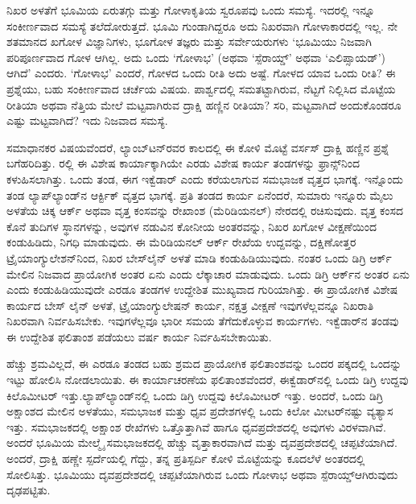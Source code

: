ನಿಖರ ಅಳತೆಗೆ ಭೂಮಿಯ ಏರುತಗ್ಗು ಮತ್ತು ಗೋಳಾಕೃತಿಯ ಸ್ವರೂಪವು ಒಂದು ಸಮಸ್ಯೆ. ಇದರಲ್ಲಿ ಇನ್ನೂ ಸಂಕೀರ್ಣವಾದ ಸಮಸ್ಯೆ ತಲೆದೋರುತ್ತದೆ. ಭೂಮಿ ಗುಂಡಾಗಿದ್ದರೂ ಅದು ನಿಖರವಾಗಿ ಗೋಳಾಕಾರದಲ್ಲಿ ಇಲ್ಲ. ನೇ ಶತಮಾನದ ಖಗೋಳ ವಿಜ್ಞಾನಿಗಳು, ಭೂಗೋಳ ತಜ್ಞರು ಮತ್ತು ಸರ್ವೇಯರುಗಳು ‘ಭೂಮಿಯು ನಿಜವಾಗಿ ಪರಿಪೂರ್ಣವಾದ ಗೋಳ ಆಗಿಲ್ಲ. ಅದು ಒಂದು ‘ಗೋಳಾಭ’ (ಅಥವಾ ‘ಸ್ಪೆರಾಯ್ಡ್​’ ಅಥವಾ ‘ಎಲಿಪ್ಸಾಯಡ್​’) ಆಗಿದೆ’ ಎಂದರು. ‘ಗೋಳಾಭ’ ಎಂದರೆ, ಗೋಳದ ಒಂದು ರೀತಿ ಅದು ಅಷ್ಟೆ. ಗೋಳದ ಯಾವ ಒಂದು ರೀತಿ? ಈ ಪ್ರಶ್ನೆಯು, ಬಹು ಸಂಕೀರ್ಣವಾದ ಚರ್ಚೆಯ ವಿಷಯ. ಪಾರ್ಶ್ವದಲ್ಲಿ ಸಮತಟ್ಟಾಗಿರುವ, ನೆಟ್ಟಗೆ ನಿಲ್ಲಿಸಿದ ಮೊಟ್ಟೆಯ ರೀತಿಯಾ ಅಥವಾ ನೆತ್ತಿಯ ಮೇಲೆ ಮಟ್ಟವಾಗಿರುವ ದ್ರಾಕ್ಷಿ ಹಣ್ಣಿನ ರೀತಿಯಾ? ಸರಿ, ಮಟ್ಟವಾಗಿದೆ ಅಂದುಕೊಂಡರೂ ಎಷ್ಟು ಮಟ್ಟವಾಗಿದೆ? ಇದು ನಿಜವಾದ ಸಮಸ್ಯೆ.

ಸಮಾಧಾನಕರ ವಿಷಯವೆಂದರೆ, ಲ್ಯಾಂಬ್​ಟನ್​ರವರ ಕಾಲದಲ್ಲಿ ಈ ಕೋಳಿ ಮೊಟ್ಟೆ ವರ್ಸಸ್​ ದ್ರಾಕ್ಷಿ ಹಣ್ಣಿನ ಪ್ರಶ್ನೆ ಬಗೆಹರಿದಿತ್ತು. ರಲ್ಲಿ ಈ ವಿಶೇಷ ಕಾರ್ಯಾಕ್ಕಾಗಿಯೇ ಎರಡು ವಿಶೇಷ ಕಾರ್ಯ ತಂಡಗಳನ್ನು ಫ್ರಾನ್ಸ್​ನಿಂದ ಕಳುಹಿಸಲಾಗಿತ್ತು. ಒಂದು ತಂಡ, ಈಗ ಇಕ್ವೆಡಾರ್​ ಎಂದು ಕರೆಯಲಾಗುವ ಸಮಭಾಜಕ ವೃತ್ತದ ಭಾಗಕ್ಕೆ. ಇನ್ನೊಂದು ತಂಡ ಲ್ಯಾಪ್​ಲ್ಯಾಂಡ್​ನ ಆರ್ಕ್ಟಿಕ್​ ವೃತ್ತದ ಭಾಗಕ್ಕೆ. ಪ್ರತಿ ತಂಡದ ಕಾರ್ಯ ಏನೆಂದರೆ, ಸುಮಾರು ಇನ್ನೂರು ಮೈಲು ಅಳತೆಯ ಚಿಕ್ಕ ಆರ್ಕ್ ಅಥವಾ ವೃತ್ತ ಕಂಸವನ್ನು ರೇಖಾಂಶ (ಮೆರಿಡಿಯನಲ್​) ನೇರದಲ್ಲಿ ರಚಿಸುವುದು. ವೃತ್ತ ಕಂಸದ ಕೊನೆ ತುದಿಗಳ ಸ್ಥಾನಗಳನ್ನು, ಅವುಗಳ ನಡುವಿನ ಕೋನೀಯ ಅಂತರವನ್ನು, ನಿಖರ ಖಗೋಳ ವೀಕ್ಷಣೆಯಿಂದ ಕಂಡುಹಿಡಿದು, ನಿಗಧಿ ಮಾಡುವುದು. ಈ ಮೆರಿಡಿಯನಲ್​ ಆರ್ಕ್ ರೇಖೆಯ ಉದ್ದವನ್ನು, ದಕ್ಷಿಣೋತ್ತರ ಟ್ರೈಯಾಂಗ್ಯುಲೇಶನ್​ನಿಂದ, ನಿಖರ ಬೇಸ್​ಲೈನ್​ ಅಳತೆ ಮಾಡಿ ಕಂಡುಹಿಡಿಯುವುದು. ನಂತರ ಒಂದು ಡಿಗ್ರಿ ಆರ್ಕ್ ಮೇಲಿನ ನಿಜವಾದ ಪ್ರಾಯೋಗಿಕ ಅಂತರ ಏನು ಎಂದು ಲೆಕ್ಕಾಚಾರ ಮಾಡುವುದು. ಒಂದು ಡಿಗ್ರಿ ಆರ್ಕ್‌ನ ಅಂತರ ಏನು ಎಂದು ಕಂಡುಹಿಡಿಯುವುದೇ ಎರಡೂ ತಂಡಗಳ ಉದ್ದೇಶಿತ ಮುಖ್ಯವಾದ ಗುರಿಯಾಗಿತ್ತು. ಈ ಪ್ರಾಯೋಗಿಕ ವಿಶೇಷ ಕಾರ್ಯದ ಬೇಸ್​ ಲೈನ್​ ಅಳತೆ, ಟ್ರೈಯಾಂಗ್ಯುಲೇಷನ್​ ಕಾರ್ಯ, ನಕ್ಷತ್ರ ವೀಕ್ಷಣೆ ಇವುಗಳೆಲ್ಲವನ್ನೂ ನಿಖರಾತಿ ನಿಖರವಾಗಿ ನಿರ್ವಹಿಸಬೇಕು. ಇವುಗಳೆಲ್ಲವೂ ಭಾರೀ ಸಮಯ ತೆಗೆದುಕೊಳ್ಳುವ ಕಾರ್ಯಗಳು. ಇಕ್ವೆಡಾರ್​ನ ತಂಡವು ಈ ಉದ್ದೇಶಿತ ಫಲಿತಾಂಶ ಪಡೆಯಲು  ವರ್ಷ ಕಾರ್ಯ ನಿರ್ವಹಿಸಬೇಕಾಯಿತು.

ಹೆಚ್ಚು ಶ್ರಮವಿಲ್ಲದೆ, ಈ ಎರಡೂ ತಂಡದ ಬಹು ಶ್ರಮದ ಪ್ರಾಯೋಗಿಕ ಫಲಿತಾಂಶವನ್ನು ಒಂದರ ಪಕ್ಕದಲ್ಲಿ ಒಂದನ್ನು ಇಟ್ಟು ಹೋಲಿಸಿ ನೋಡಲಾಯಿತು. ಈ ಕಾರ್ಯಾಚರಣೆಯ ಫಲಿತಾಂಶವೆಂದರೆ, ಈಕ್ವೆಡಾರ್​ನಲ್ಲಿ ಒಂದು ಡಿಗ್ರಿ ಉದ್ದವು  ಕಿಲೊಮೀಟರ್​ ಇತ್ತು.\break ಲ್ಯಾಪ್​ಲ್ಯಾಂಡ್​ನಲ್ಲಿ ಒಂದು ಡಿಗ್ರಿ ಉದ್ದವು  ಕಿಲೊಮೀಟರ್​ ಇತ್ತು. ಅಂದರೆ, ಒಂದು ಡಿಗ್ರಿ ಅಕ್ಷಾಂಶದ ಮೇಲಿನ ಅಳತೆಯು, ಸಮಭಾಜಕ ಮತ್ತು ಧೃವ ಪ್ರದೇಶಗಳಲ್ಲಿ ಒಂದು ಕಿಲೋ ಮೀಟರ್​ನಷ್ಟು ವ್ಯತ್ಯಾಸ ಇತ್ತು. ಸಮಭಾಜಕದಲ್ಲಿ ಅಕ್ಷಾಂಶ ರೇಖೆಗಳು ಒತ್ತೊತ್ತಾಗಿವೆ ಹಾಗೂ ಧೃವಪ್ರದೇಶದಲ್ಲಿ ಅವುಗಳು ವಿರಳವಾಗಿವೆ. ಅಂದರೆ ಭೂಮಿಯ ಮೇಲ್ಮೈ ಸಮಭಾಜಕದಲ್ಲಿ ಹೆಚ್ಚು ವೃತ್ತಾಕಾರವಾಗಿದೆ ಮತ್ತು ದೃವಪ್ರದೇಶದಲ್ಲಿ ಚಪ್ಪಟೆಯಾಗಿದೆ. ಅಂದರೆ, ದ್ರಾಕ್ಷಿ ಹಣ್ಣೇ ಸ್ಪರ್ದೆಯಲ್ಲಿ ಗೆದ್ದು, ತನ್ನ ಪ್ರತಿಸ್ಪರ್ದಿ ಕೋಳಿ ಮೊಟ್ಟೆಯನ್ನು ಕೂದಲೆಳೆ ಅಂತರದಲ್ಲಿ ಸೋಲಿಸಿತ್ತು. ಭೂಮಿಯು ದೃವಪ್ರದೇಶದಲ್ಲಿ ಚಪ್ಪಟೆಯಾಗಿರುವ ಒಂದು ಗೋಳಾಭ ಅಥವಾ ಸ್ಪೆರಾಯ್ಡ್​ ಆಗಿರುವುದು ದೃಢಪಟ್ಟಿತು.

